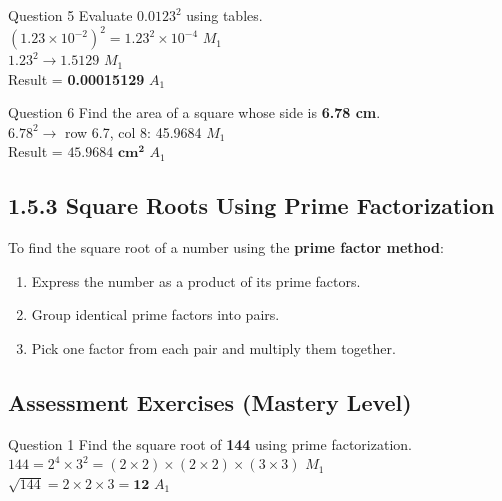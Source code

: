 \documentclass[12pt, a4paper, oneside]{article}
\begin{document}
\begin{solvingbox}{Question 5}
Evaluate $0.0123^2$ using tables. \\
$(1.23 \times 10^{-2})^2 = 1.23^2 \times 10^{-4}$ \hfill $M_1$ \\
$1.23^2 \rightarrow 1.5129$ \hfill $M_1$ \\
Result = \textbf{0.00015129} \hfill $A_1$
\end{solvingbox}

\begin{solvingbox}{Question 6}
Find the area of a square whose side is \textbf{6.78 cm}. \\
$6.78^2 \rightarrow$ row 6.7, col 8: 45.9684 \hfill $M_1$ \\
Result = $\mathbf{45.9684\text{ cm}^2}$ \hfill $A_1$
\end{solvingbox}

\subsection*{1.5.3 Square Roots Using Prime Factorization}

\begin{tcolorbox}[colback=lightgrey, colframe=primaryblue, title=\textbf{Concept Summary}, arc=5pt]
    To find the square root of a number using the \textbf{prime factor method}:
    \begin{enumerate}
        \item Express the number as a product of its prime factors.
        \item Group identical prime factors into pairs.
        \item Pick one factor from each pair and multiply them together.
    \end{enumerate}
\end{tcolorbox}

\subsection*{Assessment Exercises (Mastery Level)}

\begin{solvingbox}{Question 1}
Find the square root of \textbf{144} using prime factorization. \\
$144 = 2^4 \times 3^2 = (2 \times 2) \times (2 \times 2) \times (3 \times 3)$ \hfill $M_1$ \\
$\sqrt{144} = 2 \times 2 \times 3 = \mathbf{12}$ \hfill $A_1$
\end{solvingbox}
\end{document}
